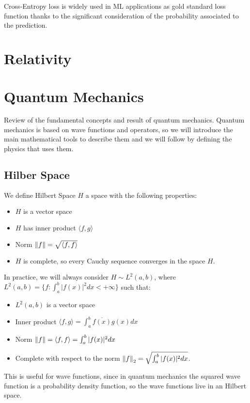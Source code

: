 \documentclass[12pt,a4paper]{article}
\begin{document}
\begin{itemize}
	Cross-Entropy loss is widely used in ML applications as gold standard loss function thanks to the significant consideration of the probability associated to the prediction.

	
\end{itemize}
\section{Relativity}

\section{Quantum Mechanics}
Review of the fundamental concepts and result of quantum mechanics. Quantum mechanics is based
on wave functions and operators, so we will introduce the main mathematical tools to describe
them and we will follow by defining the physics that uses them.

\subsection{Hilber Space}
We define Hilbert Space $H$ a space with the following properties:
\begin{itemize}
	\item [1.] $H$ is a vector space
	\item [2.] $H$ has inner product $\langle f , g \rangle$
	\item [3.] Norm $\norm{f} = \sqrt{\langle f , f \rangle}$
	\item [4.] $H$ is complete, so every Cauchy sequence converges in the space $H$.
\end{itemize}
In practice, we will always consider
$H \sim L^2(a,b)$, where $L^2(a,b) = \{ f : \int_{a}^{b} |f(x)|^2 dx < +\infty \} $ such that:
\begin{itemize}
	\item [1.] $L^2(a,b)$ is a vector space
	\item [2.] Inner product $\langle f , g \rangle = \int_{a}^{b} \overline{f(x)}g(x) dx$
	\item [3.] Norm $\norm{f} = \langle f , f \rangle = \int_{a}^{b} |f(x)|^2 dx$
	\item [4.] Complete with respect to the norm $\norm{f}_2 = \sqrt{\int_{a}^{b} |f(x)|^2 dx}$.
\end{itemize}
This is useful for wave functions, since in quantum mechanics the squared wave function
is a probability density function, so the wave functions live in an Hilbert space.
\end{document}
